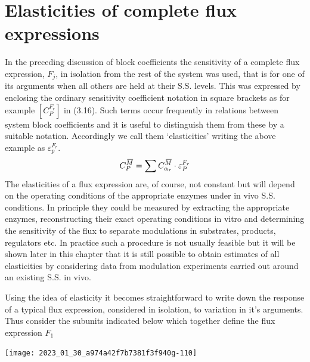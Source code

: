 \section{Elasticities of complete flux expressions}

In the preceding discussion of block coefficients the sensitivity of a complete flux expression, $F_{j}$, in isolation from the rest of the system was used, that is for one of its arguments when all others are held at their S.S. levels. This was expressed by enclosing the ordinary sensitivity coefficient notation in square brackets as for example $\left[C_{P}^{F_r}\right]$ in (3.16). Such terms occur frequently in relations between system block coefficients and it is useful to distinguish them from these by a suitable notation. Accordingly we call them `elasticities' writing the above example as $\varepsilon_{p}^{F_r}$.
%
\begin{equation}
C_{P}^{\,\overline{\!{M}}} = \sum C_{\alpha_{r}}^{\,\overline{\!{M}}} \cdot \varepsilon^{F_r}_P
\label{eqn:323}
\end{equation}
%
The elasticities of a flux expression are, of course, not constant but will depend on the operating conditions of the appropriate enzymes under in vivo S.S. conditions. In principle they could be measured by extracting the appropriate enzymes, reconstructing their exact operating conditions in vitro and determining the sensitivity of the flux to separate modulations in substrates, products, regulators etc. In practice such a procedure is not usually feasible but it will be shown later in this chapter that it is still possible to obtain estimates of all elasticities by considering data from modulation experiments carried out around an existing S.S. in vivo.

Using the idea of elasticity it becomes straightforward to write down the response of a typical flux expression, considered in isolation, to variation in it's arguments. Thus consider the subunits indicated below which together define the flux expression $F_{1}$

\begin{center}
\texttt{[image: 2023\_01\_30\_a974a42f7b7381f3f940g-110]}
\end{center}

